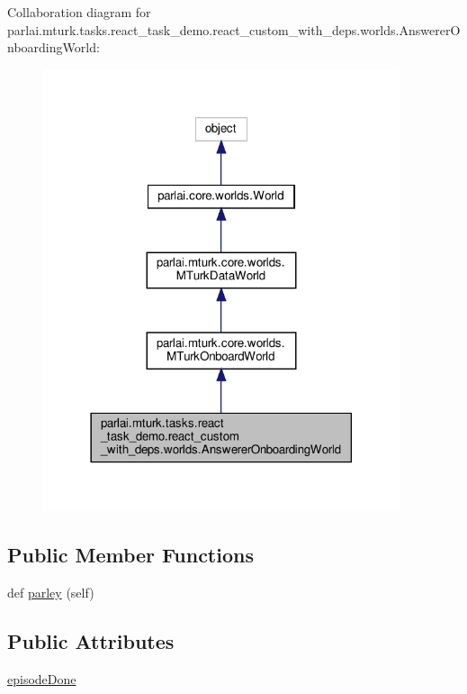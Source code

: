 Collaboration diagram for parlai.\+mturk.\+tasks.\+react\+\_\+task\+\_\+demo.\+react\+\_\+custom\+\_\+with\+\_\+deps.\+worlds.\+Answerer\+Onboarding\+World\+:
\nopagebreak
\begin{figure}[H]
\begin{center}
\leavevmode
\includegraphics[width=297pt]{classparlai_1_1mturk_1_1tasks_1_1react__task__demo_1_1react__custom__with__deps_1_1worlds_1_1Ans7da51e14153f06cdb869df4dfb74462b}
\end{center}
\end{figure}
\subsection*{Public Member Functions}
\begin{DoxyCompactItemize}
\item 
def \hyperlink{classparlai_1_1mturk_1_1tasks_1_1react__task__demo_1_1react__custom__with__deps_1_1worlds_1_1AnswererOnboardingWorld_a47bce45c8bde1d8760e0374d68aedf3b}{parley} (self)
\end{DoxyCompactItemize}
\subsection*{Public Attributes}
\begin{DoxyCompactItemize}
\item 
\hyperlink{classparlai_1_1mturk_1_1tasks_1_1react__task__demo_1_1react__custom__with__deps_1_1worlds_1_1AnswererOnboardingWorld_a2a3163879f0a16498014e352816e1f84}{episode\+Done}
\end{DoxyCompactItemize}


